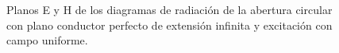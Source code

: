 \begin{figure} [H]
\centering 
{}
\hspace{5mm}
\caption{Planos E y H de los diagramas de radiación de la abertura circular con plano conductor perfecto de extensión infinita y excitación con campo uniforme.}
\label{grup_fig_estudio:3}
\end{figure}

